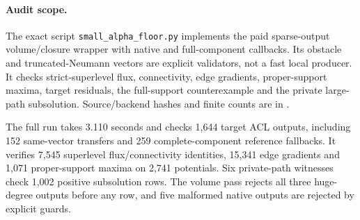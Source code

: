 \paragraph{Audit scope.}
The exact script \texttt{small\_alpha\_floor.py} implements the paid
sparse-output volume/closure wrapper with native and full-component
callbacks. Its obstacle and truncated-Neumann vectors are explicit
validators, not a fast local producer. It checks strict-superlevel flux,
connectivity, edge gradients, proper-support maxima, target residuals,
the full-support counterexample and the private large-path subsolution.
Source/backend hashes and finite counts are in
.

The full run takes 3.110 seconds and checks 1,644 target ACL outputs,
including 152 same-vector transfers and 259 complete-component reference
fallbacks. It verifies 7,545 superlevel flux/connectivity identities,
15,341 edge gradients and 1,071 proper-support maxima on 2,741 potentials.
Six private-path witnesses check 1,002 positive subsolution rows. The
volume pass rejects all three huge-degree outputs before any row, and
five malformed native outputs are rejected by explicit guards.
